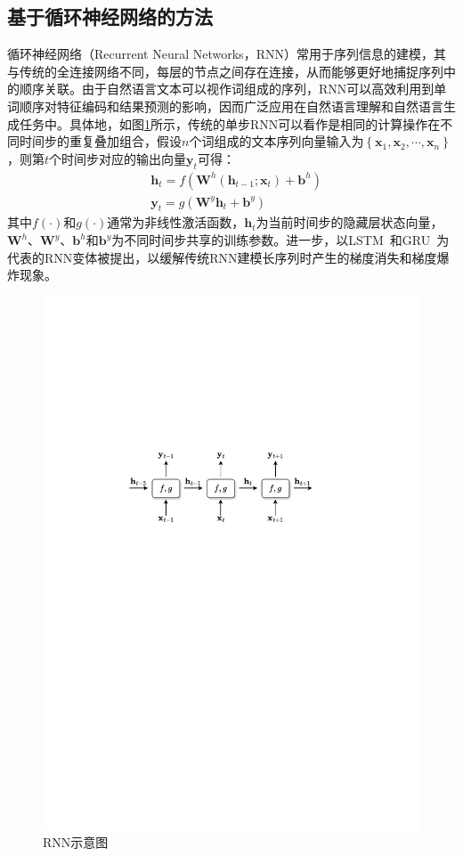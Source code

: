 \subsection{基于循环神经网络的方法}

循环神经网络（Recurrent Neural Networks，RNN）\cite{rumelhart1986learning}常用于序列信息的建模，其与传统的全连接网络不同，每层的节点之间存在连接，从而能够更好地捕捉序列中的顺序关联。由于自然语言文本可以视作词组成的序列，RNN可以高效利用到单词顺序对特征编码和结果预测的影响，因而广泛应用在自然语言理解和自然语言生成任务中。具体地，如图\ref{rnn}所示，传统的单步RNN可以看作是相同的计算操作在不同时间步的重复叠加组合，假设$n$个词组成的文本序列向量输入为$\left\{\boldsymbol{x}_{1}, \boldsymbol{x}_{2}, \cdots, \boldsymbol{x}_{n}\right\}$，则第$t$个时间步对应的输出向量$\boldsymbol{y}_{t}$可得：
\begin{equation}
    \begin{aligned}
& \boldsymbol{h}_t=f\left(\boldsymbol{W}^h\left(\boldsymbol{h}_{t-1} ; \boldsymbol{x}_t\right)+\boldsymbol{b}^h\right) \\
& \boldsymbol{y}_t=g\left(\boldsymbol{W}^y \boldsymbol{h}_t+\boldsymbol{b}^y\right)
\end{aligned}
\end{equation}
其中$f(\cdot)$和$g(\cdot)$通常为非线性激活函数，$\boldsymbol{h}_t$为当前时间步的隐藏层状态向量，$\boldsymbol{W}^h$、$\boldsymbol{W}^y$、$\boldsymbol{b}^h$和$\boldsymbol{b}^y$为不同时间步共享的训练参数。进一步，以LSTM~\cite{hochreiter1997long}和GRU~\cite{cho2014learning}为代表的RNN变体被提出，以缓解传统RNN建模长序列时产生的梯度消失和梯度爆炸现象。

\begin{figure}[htp]
   \centering
   \includegraphics[width=0.7\linewidth]{figures/chap2/rnn.pdf}
   \caption{RNN示意图}
   \label{rnn}
\end{figure}

